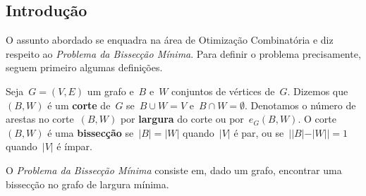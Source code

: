 \documentclass[a0,portrait]{a0poster}
\begin{document}
\begin{multicols}{3} %


\color{Navy} %





  

\color{Black} %
\section*{Introdução}
    O assunto abordado se
    enquadra na área de Otimização Combinatória e diz respeito ao 
    \emph{Problema da Bissecção Mínima}. Para definir o problema 
    precisamente, seguem primeiro algumas definições. 

    Seja~${G=(V,E)}$ um grafo e~$B$ e~$W$ conjuntos de vértices de~$G$.
    Dizemos que~$(B,W)$ é um \textbf{corte}
    de~$G$ se~${B \cup W = V}$ e~${B\cap W =\emptyset}$.
    Denotamos o número de arestas no corte~$(B,W)$ por \textbf{largura}
    do corte ou por~$e_G(B,W)$.
    O corte~$(B,W)$ é uma \textbf{bissecção} se~${|B| =|W|}$
    quando~$|V|$ é par, ou se~${||B|-|W|| =1}$ quando~$|V|$ é ímpar.

    O \emph{Problema da Bissecção Mínima} consiste em, dado um grafo, 
    encontrar uma bissecção no grafo de largura mínima.


\end{multicols}
\end{document}
